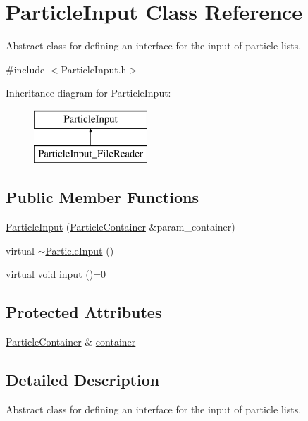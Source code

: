 \hypertarget{classParticleInput}{\section{Particle\-Input Class Reference}
\label{classParticleInput}
}


Abstract class for defining an interface for the input of particle lists.  




{\ttfamily \#include $<$Particle\-Input.\-h$>$}

Inheritance diagram for Particle\-Input\-:\begin{figure}[H]
\begin{center}
\leavevmode
\includegraphics[height=2.000000cm]{classParticleInput}
\end{center}
\end{figure}
\subsection*{Public Member Functions}
\begin{DoxyCompactItemize}
\item 
\hyperlink{classParticleInput_a7a35cee7d46b136f77931ce026162766}{Particle\-Input} (\hyperlink{classParticleContainer}{Particle\-Container} \&param\-\_\-container)
\item 
virtual \hyperlink{classParticleInput_a0aaa7ea30dfa35434578f6dce36ab41a}{$\sim$\-Particle\-Input} ()
\item 
virtual void \hyperlink{classParticleInput_ae2cf2ec2140737d00b2212cc184afbdc}{input} ()=0
\end{DoxyCompactItemize}
\subsection*{Protected Attributes}
\begin{DoxyCompactItemize}
\item 
\hyperlink{classParticleContainer}{Particle\-Container} \& \hyperlink{classParticleInput_ab273aa8b897a17ed79f1b40082056dae}{container}
\end{DoxyCompactItemize}


\subsection{Detailed Description}
Abstract class for defining an interface for the input of particle lists. 

